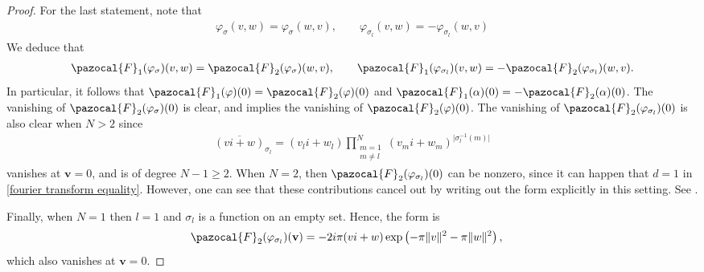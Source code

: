 \documentclass[a4paper,11pt]{amsart} %
\newcommand{\8}{\infty}
\newcommand{\vbf}{\mathbf{v}}
\newcommand{\four}{\pazocal{F}}
\theoremstyle{mytheoremstyle}
\theoremstyle{remark}
\newtheorem{rmk}{Remark}[section]
\numberwithin{equation}{section}
\begin{document}
\begin{proof}
 For the last statement, note that 
 \begin{align}
\varphi_\sigma(v,w)=\varphi_\sigma(w,v), \qquad \varphi_{\sigma_l}(v,w)=-\varphi_{\sigma_l}(w,v)
\end{align} We deduce that 
\begin{align}
\four_1(\varphi_\sigma)(v,w) =\four_2(\varphi_\sigma)(w,v), \qquad \four_1( \varphi_{\sigma_l})(v,w)= -\four_2( \varphi_{\sigma_l})(w,v).
\end{align} In particular, it follows that $\four_1(\varphi)(0)=\four_2(\varphi)(0)$ and $\four_1(\alpha)(0)=-\four_2(\alpha)(0)$. The vanishing of $\four_2( \varphi_\sigma)(0)$ is clear, and implies the vanishing of $\four_2(\varphi)(0)$. The vanishing of $\four_2( \varphi_{\sigma_l})(0)$ is also clear when $N>2$ since 
 \begin{align}
\overline{(vi+w)}_{\sigma_l}=(v_li+w_l)\prod_{\substack{m=1 \\ m \neq l}}^N (v_mi+w_m)^{\vert \sigma_l^{-1}(m) \vert}
\end{align} vanishes at $\vbf=0$, and is of degree $N-1 \geq 2$.  When $N=2$, then $\four_2( \varphi_{\sigma_l})(0)$ can be nonzero, since it can happen that $d=1$ in \eqref{fourier transform equality}. However, one can see that these contributions cancel out by writing out the form explicitly in this setting. See \cite[Proposition.~3.2]{rbrsln2}.


 Finally, when $N=1$ then $l=1$ and $\sigma_l$ is a function on an empty set. Hence, the form is
 \begin{align} \four_2( \varphi_{\sigma_l})(\vbf)& =-2i\pi (vi+w)\exp\left (-\pi  \lVert v\rVert^2-\pi \lVert w \rVert^2 \right ),
\end{align}
which also vanishes at $\vbf=0$.
\end{proof}

\end{document}
